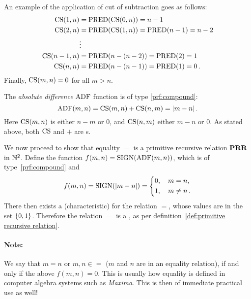 \documentclass[11pt,a4paper]{article}
\begin{document}
An example of the application of cut of subtraction goes as follows:
\begin{align*}
    \operatorname{CS}(1,n)    &= \operatorname{PRED}(\operatorname{CS}(0,n)) = n-1 \\
    \operatorname{CS}(2,n)    &= \operatorname{PRED}(\operatorname{CS}(1,n)) = \operatorname{PRED}(n-1) = n-2 \\
                &\vdots \\
    \operatorname{CS}(n-1,n)  &= \operatorname{PRED}(n-(n-2)) = \operatorname{PRED}(2) = 1 \\
    \operatorname{CS}(n,n)  &= \operatorname{PRED}(n-(n-1)) = \operatorname{PRED}(1) = 0 \,.
\end{align*}
Finally, \(\operatorname{CS}(m,n) = 0\) for all \(m > n\).

\begin{example}[IX]\label{exa:PRF absolute difference}
    The \emph{absolute difference} \(\operatorname{ADF}\) function is
    of type \eqref{prf:compound}:
    \begin{equation*}
        \ADF(m,n) = \CS(m,n) + \CS(n,m) = \abs{m-n}\,.
    \end{equation*}
    Here \(\operatorname{CS}(m,n)\) is either \(n-m\) or \(0\),
    and \(\operatorname{CS}(n,m)\) either \(m-n\) or \(0\).
    As stated above, both \(\operatorname{CS}\) and \(+\)
    are \PRF{}s.
\end{example}

We now proceed to show that equality \(=\) is a primitive recursive
relation \(\textbf{PRR}\) in \(\mathbb{N}^2\). Define the function \(f(m,n) = \operatorname{SIGN}(\operatorname{ADF}(m,n))\),
which is of type~\eqref{prf:compound} and
\begin{equation*}
    f(m,n) = \operatorname{SIGN}(\rvert m-n\lvert) = \left\{
        \begin{aligned}
            0&,\quad m = n, \\
            1&,\quad m \neq n\,.
        \end{aligned}
    \right.
\end{equation*}
There then exists a (characteristic) \PRF{} for the relation \(=\),
whose values are in the set \(\{0,1\}\). Therefore the
relation \(=\) is a \PRR, as per definition~\ref{def:primitive recursive relation}.

\paragraph{Note:}
We say that \(m = n\) or \(m,n\in=\) (\(m\) and \(n\) are in an equality relation),
if and only if the above \PRF{} \(f(m,n) = 0\).
This is usually how equality is defined in computer algebra systems
such as \emph{Maxima}. This is then of immediate practical use as well!
\end{document}
